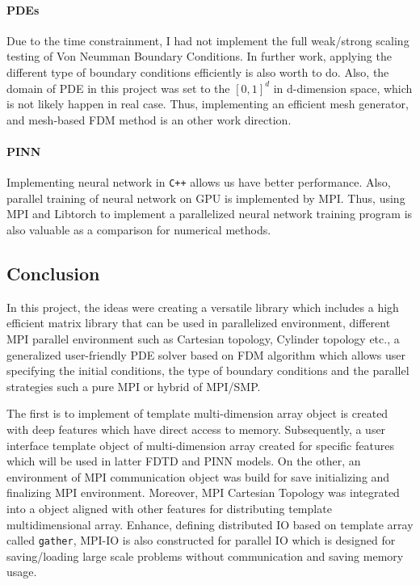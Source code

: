 \paragraph{PDEs}
Due to the time constrainment, I had not implement the full weak/strong scaling testing of Von Neumman Boundary Conditions.
In further work, applying the different type of boundary conditions efficiently is also worth to do.
Also, the domain of PDE in this project was set to the $[0,1]^d$ in d-dimension space, which is not likely happen in real case.
Thus, implementing an efficient mesh generator, and mesh-based FDM method is an other work direction.

\paragraph{PINN}
Implementing neural network in \texttt{C++}
allows us have better performance.
Also, parallel training of neural network on GPU is implemented by MPI.
Thus, using MPI and Libtorch to implement a parallelized neural network training program is also valuable 
as a comparison for numerical methods.


\subsection{Conclusion}
In this project, the ideas were creating a versatile library which includes 
a high efficient matrix library that can be used in parallelized environment, 
different MPI parallel environment such as Cartesian topology, Cylinder topology etc., 
a generalized user-friendly PDE solver based on FDM algorithm which allows user specifying 
the initial conditions, the type of boundary conditions and the parallel strategies such a pure MPI or hybrid of MPI/SMP.

The first is to implement of template multi-dimension array object is created with deep features 
which have direct access to memory.
Subsequently, a user interface template object of multi-dimension array created for specific features which will be used 
in latter FDTD and PINN models.
On the other, an environment of MPI communication object was build for save initializing and finalizing MPI environment.
Moreover, MPI Cartesian Topology was integrated into a object aligned with other 
features for distributing template multidimensional array.
Enhance, defining distributed IO based on template array called \texttt{gather}, MPI-IO is also constructed for 
parallel IO which is designed for saving/loading large scale problems without communication and saving memory usage.

